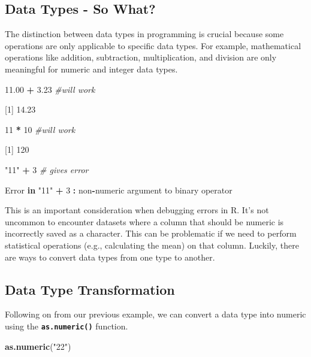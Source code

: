 \documentclass[
]{book}
\newenvironment{Shaded}{\begin{snugshade}}{\end{snugshade}}
\newcommand{\CommentTok}[1]{\textcolor[rgb]{0.56,0.35,0.01}{\textit{#1}}}
\newcommand{\ControlFlowTok}[1]{\textcolor[rgb]{0.13,0.29,0.53}{\textbf{#1}}}
\newcommand{\DecValTok}[1]{\textcolor[rgb]{0.00,0.00,0.81}{#1}}
\newcommand{\FloatTok}[1]{\textcolor[rgb]{0.00,0.00,0.81}{#1}}
\newcommand{\FunctionTok}[1]{\textcolor[rgb]{0.13,0.29,0.53}{\textbf{#1}}}
\newcommand{\NormalTok}[1]{#1}
\newcommand{\SpecialCharTok}[1]{\textcolor[rgb]{0.81,0.36,0.00}{\textbf{#1}}}
\newcommand{\StringTok}[1]{\textcolor[rgb]{0.31,0.60,0.02}{#1}}
\begin{document}
\subsection{Data Types - So What?}\label{data-types---so-what}

The distinction between data types in programming is crucial because some operations are only applicable to specific data types. For example, mathematical operations like addition, subtraction, multiplication, and division are only meaningful for numeric and integer data types.

\begin{Shaded}
\begin{Highlighting}[]
\FloatTok{11.00} \SpecialCharTok{+} \FloatTok{3.23} \CommentTok{\#will work}

\NormalTok{[}\DecValTok{1}\NormalTok{] }\FloatTok{14.23}


\DecValTok{11} \SpecialCharTok{*} \DecValTok{10} \CommentTok{\#will work}

\NormalTok{[}\DecValTok{1}\NormalTok{] }\DecValTok{120}

\StringTok{"11"} \SpecialCharTok{+} \DecValTok{3} \CommentTok{\# gives error}

\NormalTok{Error }\ControlFlowTok{in} \StringTok{"11"} \SpecialCharTok{+} \DecValTok{3} \SpecialCharTok{:}\NormalTok{ non}\SpecialCharTok{{-}}\NormalTok{numeric argument to binary operator}
\end{Highlighting}
\end{Shaded}

This is an important consideration when debugging errors in R. It's not uncommon to encounter datasets where a column that should be numeric is incorrectly saved as a character. This can be problematic if we need to perform statistical operations (e.g., calculating the mean) on that column. Luckily, there are ways to convert data types from one type to another.

\subsection{Data Type Transformation}\label{data-type-transformation}

Following on from our previous example, we can convert a data type into numeric using the \textbf{\texttt{as.numeric()}} function.

\begin{Shaded}
\begin{Highlighting}[]
\FunctionTok{as.numeric}\NormalTok{(}\StringTok{"22"}\NormalTok{)}
\end{Highlighting}
\end{Shaded}
\end{document}
